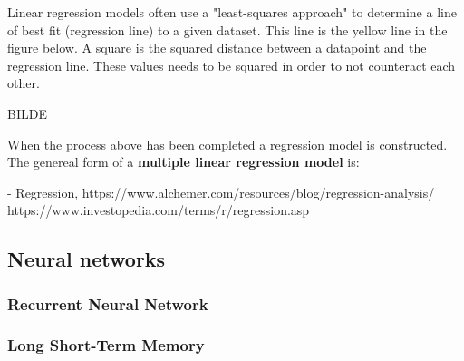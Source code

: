 Linear regression models often use a "least-squares approach" to determine a line of best fit (regression line) to a given dataset. This line is the yellow line in the figure below. A square is the squared distance between a datapoint and the regression line. These values needs to be squared in order to not counteract each other.   

BILDE

When the process above has been completed a regression model is constructed. The genereal form of a \textbf{multiple linear regression model} is:  

- Regression, https://www.alchemer.com/resources/blog/regression-analysis/\\ 

https://www.investopedia.com/terms/r/regression.asp

\subsection{Neural networks}
\subsubsection{Recurrent Neural Network}
\subsubsection{Long Short-Term Memory}